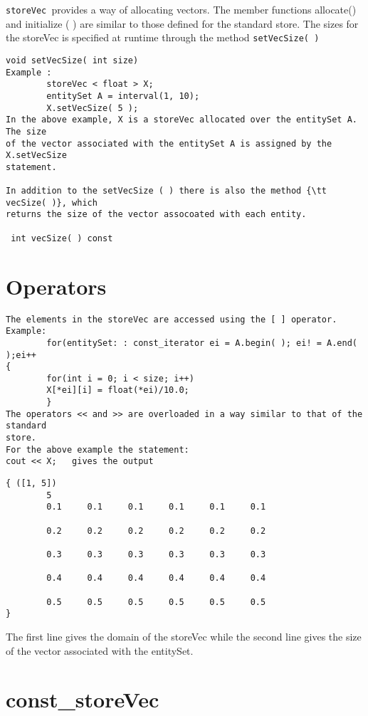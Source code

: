\documentclass[letterpaper,12pt]{article}
\begin{document}
{\tt storeVec }provides a way of allocating vectors. The member functions
allocate() and initialize ( ) are similar to those defined for the standard store. The 
sizes for the storeVec is specified at runtime through the method {\tt  setVecSize( )}
\begin{verbatim}
void setVecSize( int size)
Example : 
        storeVec < float > X;
        entitySet A = interval(1, 10);
        X.setVecSize( 5 );
In the above example, X is a storeVec allocated over the entitySet A. The size 
of the vector associated with the entitySet A is assigned by the X.setVecSize 
statement.

In addition to the setVecSize ( ) there is also the method {\tt vecSize( )}, which 
returns the size of the vector assocoated with each entity.

 int vecSize( ) const
\end{verbatim}

\section*{Operators}
\begin{verbatim}
The elements in the storeVec are accessed using the [ ] operator. 
Example:
        for(entitySet: : const_iterator ei = A.begin( ); ei! = A.end( );ei++    
{
        for(int i = 0; i < size; i++)
        X[*ei][i] = float(*ei)/10.0;
        }
The operators << and >> are overloaded in a way similar to that of the standard 
store. 
For the above example the statement:
cout << X;   gives the output 
\end{verbatim}
   \pagebreak[4]     
\begin{verbatim}
{ ([1, 5])
        5   
        0.1     0.1     0.1     0.1     0.1     0.1
        
        0.2     0.2     0.2     0.2     0.2     0.2

        0.3     0.3     0.3     0.3     0.3     0.3

        0.4     0.4     0.4     0.4     0.4     0.4

        0.5     0.5     0.5     0.5     0.5     0.5
}

\end{verbatim}
The first line gives the domain of the storeVec while the second line gives the 
size of the vector associated with the entitySet.
\section{const\_storeVec}
\end{document}
